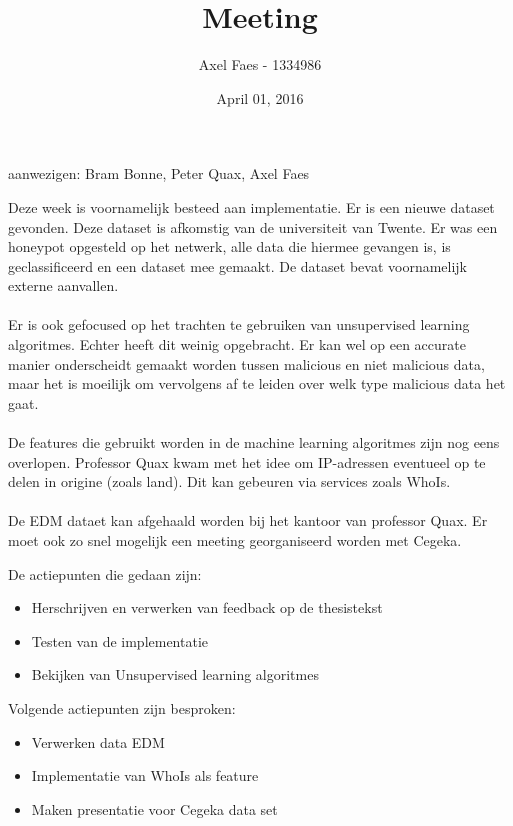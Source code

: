 \documentclass[notitlepage]{article}
\title{Meeting}
\author{Axel Faes - 1334986}
\date{April 01, 2016}
\begin{document}
\maketitle

aanwezigen: Bram Bonne, Peter Quax, Axel Faes

Deze week is voornamelijk besteed aan implementatie. Er is een nieuwe dataset gevonden. Deze dataset is afkomstig van de universiteit van Twente. Er was een honeypot opgesteld op het netwerk, alle data die hiermee gevangen is, is geclassificeerd en een dataset mee gemaakt. De dataset bevat voornamelijk externe aanvallen. \\\\
Er is ook gefocused op het trachten te gebruiken van unsupervised learning algoritmes. Echter heeft dit weinig opgebracht. Er kan wel op een accurate manier onderscheidt gemaakt worden tussen malicious en niet malicious data, maar het is moeilijk om vervolgens af te leiden over welk type malicious data het gaat. \\\\
De features die gebruikt worden in de machine learning algoritmes zijn nog eens overlopen. Professor Quax kwam met het idee om IP-adressen eventueel op te delen in origine (zoals land). Dit kan gebeuren via services zoals WhoIs. \\\\
De EDM dataet kan afgehaald worden bij het kantoor van professor Quax. Er moet ook zo snel mogelijk een meeting georganiseerd worden met Cegeka.

De actiepunten die gedaan zijn:
\begin{itemize}  
		\item Herschrijven en verwerken van feedback op de thesistekst 
        \item Testen van de implementatie
        \item Bekijken van Unsupervised learning algoritmes
\end{itemize}

Volgende actiepunten zijn besproken:
\begin{itemize}  		
		\item Verwerken data EDM
		\item Implementatie van WhoIs als feature
       \item Maken presentatie voor Cegeka data set
\end{itemize}
\end{document}
